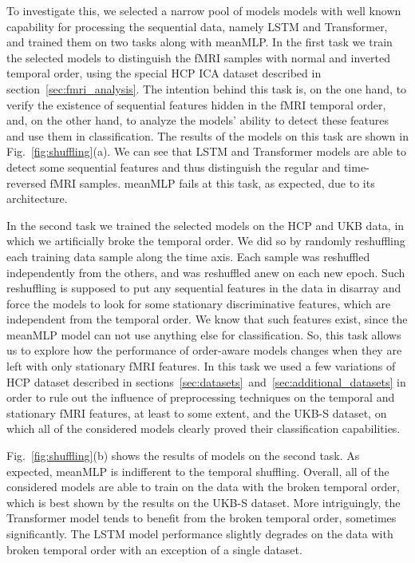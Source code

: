 \documentclass[final,5p,times,twocolumn,authoryear]{elsarticle}
\begin{document}
To investigate this, we selected a narrow pool of models models with well known capability for processing the sequential data, namely LSTM and Transformer, and trained them on two tasks along with meanMLP. In the first task we train the selected models to distinguish the fMRI samples with normal and inverted temporal order, using the special HCP ICA dataset described in section~\ref{sec:fmri_analysis}. The intention behind this task is, on the one hand, to verify the existence of sequential features hidden in the fMRI temporal order, and, on the other hand, to analyze the models’ ability to detect these features and use them in classification. The results of the models on this task are shown in Fig.~\ref{fig:shuffling}(a). We can see that LSTM and Transformer models are able to detect some sequential features and thus distinguish the regular and time-reversed fMRI samples. meanMLP fails at this task, as expected, due to its architecture.

In the second task we trained the selected models on the HCP and UKB data, in which we artificially broke the temporal order. We did so by randomly reshuffling each training data sample along the time axis. Each sample was reshuffled independently from the others, and was reshuffled anew on each new epoch. Such reshuffling is supposed to put any sequential features in the data in disarray and force the models to look for some stationary discriminative features, which are independent from the temporal order. We know that such features exist, since the meanMLP model can not use anything else for classification. So, this task allows us to explore how the performance of order-aware models changes when they are left with only stationary fMRI features. In this task we used a few variations of HCP dataset described in sections~\ref{sec:datasets}~and~\ref{sec:additional_datasets} in order to rule out the influence of preprocessing techniques on the temporal and stationary fMRI features, at least to some extent, and the UKB-S dataset, on which all of the considered models clearly proved their classification capabilities.

Fig.~\ref{fig:shuffling}(b) shows the results of models on the second task. As expected, meanMLP is indifferent to the temporal shuffling. Overall, all of the considered models are able to train on the data with the broken temporal order, which is best shown by the results on the UKB-S dataset. More intriguingly, the Transformer model tends to benefit from the broken temporal order, sometimes significantly. The LSTM model performance slightly degrades on the data with broken temporal order with an exception of a single dataset.
\end{document}
